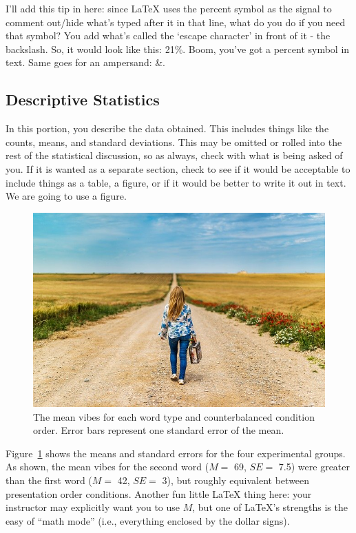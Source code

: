 \documentclass[stu,12pt,floatsintext,justification]{apa7_ula}
\begin{document}
I'll add this tip in here: since \LaTeX{} uses the percent symbol as the signal
to comment out/hide what's typed after it in that line, what do you do if you
need that symbol? You add what's called the `escape character' in front of it -
the backslash. So, it would look like this: 21\%. Boom, you've got a percent
symbol in text. Same goes for an ampersand: \&.

\subsection{Descriptive Statistics}

In this portion, you describe the data obtained. This includes things like the
counts, means, and standard deviations. This may be omitted or rolled into the
rest of the statistical discussion, so as always, check with what is being
asked of you. If it is wanted as a separate section, check to see if it would
be acceptable to include things as a table, a figure, or if it would be better
to write it out in text. We are going to use a figure.

\begin{figure}
    \centering
    \includegraphics[width=0.75\linewidth]{sampleFig.jpg}
    \caption{The mean vibes for each word type and counterbalanced condition
        order. Error bars represent one standard error of the mean.}
    \label{fig:OverallEffect}
\end{figure}

Figure~\ref{fig:OverallEffect} shows the means and standard errors for the four
experimental groups. As shown, the mean vibes for the second word ($M = $ 69,
$SE = $ 7.5) were greater than the first word ($M = $ 42, $SE = $ 3), but
roughly equivalent between presentation order conditions. Another fun little
\LaTeX{} thing here: your instructor may explicitly want you to use $M$, but
one of \LaTeX{}'s strengths is the easy of ``math mode'' (i.e., everything
enclosed by the dollar signs). %
\end{document}
